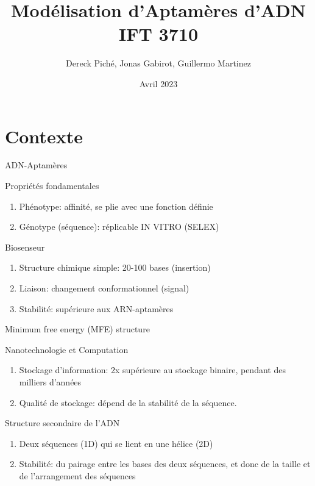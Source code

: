 \documentclass{beamer}
\title{Modélisation d'Aptamères d'ADN IFT 3710}
\author{Dereck Piché, Jonas Gabirot, Guillermo Martinez}
\institute{Université de Montréal}
\date{Avril 2023}
\begin{document}
\frame{\titlepage}

\section{Contexte}
\begin{frame}{ADN-Aptamères}
\begin{block}{Propriétés fondamentales}
\begin{enumerate}
    \item Phénotype: affinité, se plie avec une fonction définie
    \item Génotype (séquence): réplicable IN VITRO (SELEX)
\end{enumerate}
\end{block}

\begin{block}{Biosenseur}
\begin{enumerate}
    \item Structure chimique simple: 20-100 bases (insertion)
    \item Liaison: changement conformationnel (signal)
    \item Stabilité: supérieure aux ARN-aptamères
\end{enumerate}
\end{block}
\end{frame}

\begin{frame}{Minimum free energy (MFE) structure}
\begin{block}{Nanotechnologie et Computation}
\begin{enumerate}
    \item Stockage d'information: 2x supérieure au stockage binaire, pendant des milliers d'années
    \item Qualité de stockage: dépend de la stabilité de la séquence.
\end{enumerate}
\end{block}

\begin{block}{Structure secondaire de l'ADN}
\begin{enumerate}
    \item Deux séquences (1D) qui se lient en une hélice (2D)
    \item Stabilité: du pairage entre les bases des deux séquences, et donc de la taille et de l'arrangement des séquences
\end{enumerate}
\end{block}

\end{frame}
\end{document}
